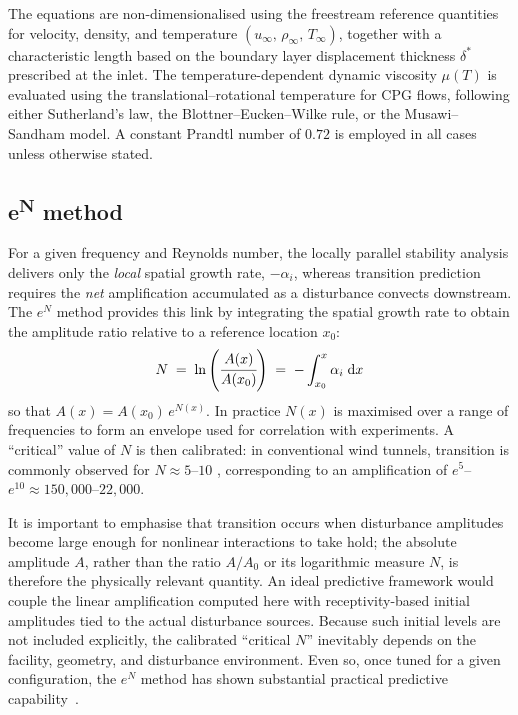 The equations are non-dimensionalised using the freestream reference quantities for velocity, density, and temperature $(u_\infty,\,\rho_\infty,\,T_\infty)$, together with a characteristic length based on the boundary layer displacement thickness $\delta^{*}$ prescribed at the inlet. The temperature-dependent dynamic viscosity $\mu(T)$ is evaluated using the translational--rotational temperature for \gls{CPG} flows, following either Sutherland's law, the Blottner--Eucken--Wilke rule, or the Musawi--Sandham model. A constant Prandtl number of $0.72$ is employed in all cases unless otherwise stated.

\subsection{e\textsuperscript{N} method}

For a given frequency and Reynolds number, the locally parallel stability analysis delivers only the \emph{local} spatial growth rate, $- \alpha_i$, whereas transition prediction requires the \emph{net} amplification accumulated as a disturbance convects downstream. The $e^N$ method \citep{SmithGamberoni1956,VanIngen1956} provides this link by integrating the spatial growth rate to obtain the amplitude ratio relative to a reference location $x_0$: %
\begin{equation}
    N \;=\; \ln{ \left( \cfrac{A(x)}{A(x_0)} \right )} \;=\; - \int_{x_0}^{x} \alpha_i \; \mathrm{d} x
\end{equation}
so that $A(x)=A(x_0)\,e^{N(x)}$. In practice $N(x)$ is maximised over a range of frequencies to form an envelope used for correlation with experiments. A ``critical'' value of $N$ is then calibrated: in conventional wind tunnels, transition is commonly observed for $N \approx 5$--$10$ \citep{Schneider2015}, corresponding to an amplification of $e^{5}$--$e^{10}\!\approx\!150{,}000$--$22{,}000$.

It is important to emphasise that transition occurs when disturbance amplitudes become large enough for nonlinear interactions to take hold; the absolute amplitude $A$, rather than the ratio $A/A_0$ or its logarithmic measure $N$, is therefore the physically relevant quantity. An ideal predictive framework would couple the linear amplification computed here with receptivity-based initial amplitudes tied to the actual disturbance sources. Because such initial levels are not included explicitly, the calibrated ``critical $N$'' inevitably depends on the facility, geometry, and disturbance environment. Even so, once tuned for a given configuration, the $e^N$ method has shown substantial practical predictive capability~\citep{Fedorov2011}.


